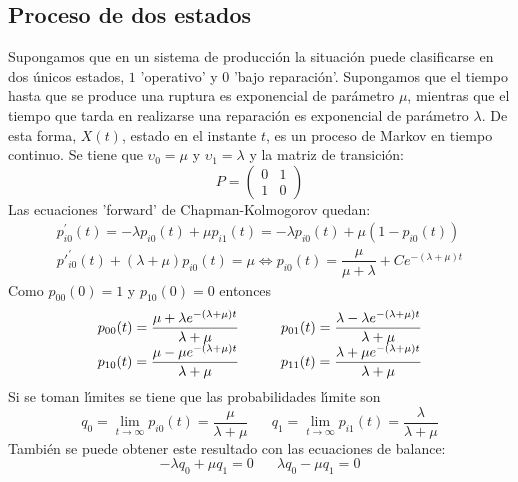 \subsection{Proceso de dos estados}
Supongamos que en un sistema de producci\'{o}n la situaci\'{o}n puede
clasificarse en dos \'{u}nicos estados, $1$ 'operativo' y $0$ 'bajo
reparaci\'{o}n'. Supongamos que el tiempo hasta que se produce una
ruptura es exponencial de par\'{a}metro $\mu$, mientras que el tiempo
que tarda en realizarse una reparaci\'{o}n es exponencial de
par\'{a}metro $\lambda$. De esta forma, $X(t)$, estado en el instante
$t$, es un proceso de Markov en tiempo continuo. Se tiene que
$\upsilon_0=\mu$ y $\upsilon_1=\lambda$ y la matriz de transici\'{o}n:
\[
P=\begin{pmatrix}
   0&1 \\
  1&0
\end{pmatrix}
\]
Las ecuaciones 'forward' de Chapman-Kolmogorov quedan:
\[
\begin{array}{l}
 p^\prime_{i0}(t)=-\lambda p_{i0}(t)+\mu p_{i1}(t)=-\lambda p_{i0}(t)+\mu
 (1-p_{i0}(t))\\[10pt]
%
p'^\prime_{i0}(t)+(\lambda +\mu )p_{i0}(t)=\mu \Leftrightarrow
p_{i0}(t)
= \dfrac{\mu}{\mu+\lambda}+ Ce^{-(\lambda+\mu)t}
\end{array}
\]
Como $p_{00}(0)=1$ y $p_{10}(0)=0$ entonces
\[
\begin{array}{ccc}
  p_{00}(t)=\dfrac{\mu+\lambda
  e^{-(\lambda+\mu)t}}{\lambda+\mu}&\hbox{}\hspace{10pt}
  &
  p_{01}(t)=\dfrac{\lambda-\lambda e^{-(\lambda+\mu)t}}{\lambda+\mu}\\
  p_{10}(t)=\dfrac{\mu-\mu e^{-(\lambda+\mu)t}}{\lambda+\mu}& \hbox{}\hspace{10pt}&
  p_{11}(t)=\dfrac{\lambda+\mu e^{-(\lambda+\mu)t}}{\lambda+\mu}
\end{array}
\]
Si se toman l\'{\i}mites se tiene que las probabilidades l\'{\i}mite son
\[
q_0=\displaystyle\lim_{t\to\infty}
p_{i0}(t)=\dfrac{\mu}{\lambda+\mu}\hspace{20pt}
q_1=\displaystyle\lim_{t\to\infty}
p_{i1}(t)=\dfrac{\lambda}{\lambda+\mu}
\]
Tambi\'{e}n se puede obtener este resultado con las ecuaciones de
balance:
\[
-\lambda q_0 + \mu q_1= 0\hspace{20pt} \lambda q_0 - \mu q_1= 0
\]
